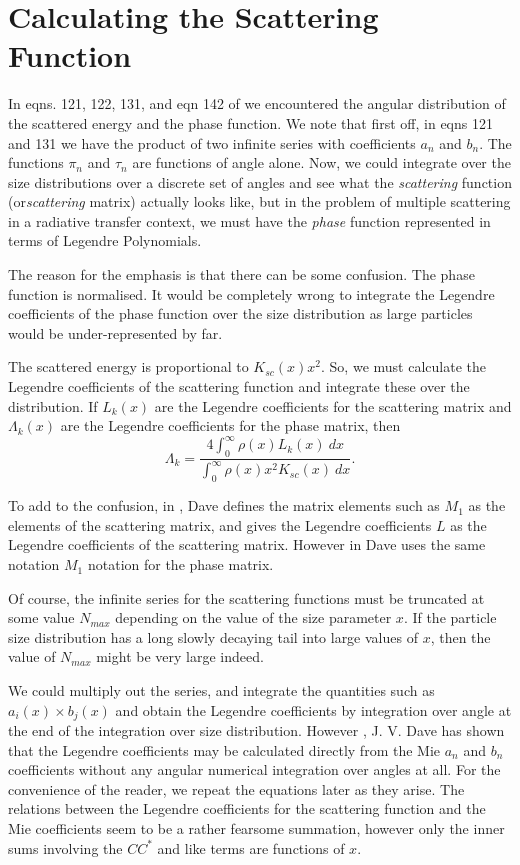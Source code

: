 \section{ Calculating the Scattering Function}

In eqns. 121, 122, 131, and eqn 142 of \cite{EMScatt:Mybib} we encountered the angular
 distribution of the scattered energy and the phase function.
We note that first off, in eqns 121 and 131 we have the product of two 
infinite series with  coefficients $a_n$ and $b_n$.
The functions $\pi_n$ and $\tau_n$ are functions of angle alone.
 Now, we could integrate over the size distributions
over a discrete set of angles and see what the {\it scattering} function
 (or{\it  scattering} matrix) actually looks like, but in
  the problem of 
multiple scattering in a radiative transfer context,
  we must have the {\it phase } function represented in
 terms of Legendre Polynomials. 

The reason for the emphasis is that there can be some confusion. The phase function
is normalised. It would be completely wrong to integrate the Legendre
coefficients of the phase function over the size distribution as large
 particles would be under-represented by far. 

The scattered energy is proportional to $K_{sc}(x) x^2$. So, we must
calculate the Legendre coefficients of the scattering function and integrate these
over the distribution. If $L_k(x)$ are the Legendre coefficients for the
 scattering matrix
and $\Lambda_k(x)$ are the Legendre coefficients for the phase matrix, then
\begin{equation}
\Lambda_k=\frac{ 
4\int_0^\infty \rho(x) L_k(x) \> dx }{
\int_0^\infty \rho(x) x^2 K_{sc}(x) \> dx }.
\end{equation}


To add to the confusion,
in \cite{Dave1:Mybib}, Dave defines the matrix elements such as $M_1$ as
the elements of the scattering matrix, and gives the Legendre coefficients $L$
as the Legendre coefficients of the scattering matrix. However in \cite{Dave2:Mybib}
Dave uses the same notation $M_1$ notation for the phase matrix.


Of course, the infinite series for the  scattering functions must 
be truncated at some value 
$N_{max}$ depending on the value 
of the size parameter $x$. If the particle size distribution 
has a long slowly decaying tail into large values of  $x$, then the 
value of $N_{max}$ might be very large indeed.


We could multiply out the series, and integrate the quantities such as
$a_i(x) \times b_j(x)$ and obtain the Legendre coefficients by integration over angle
at the end of the integration over size distribution.
However \cite{Dave1:Mybib}, J. V. Dave has 
shown that the Legendre coefficients
 may be calculated directly from the Mie $a_n$ and $b_n$ coefficients 
without any angular numerical integration over angles 
 at all. For the convenience of the reader, we repeat the
 equations later as they arise.
The relations between the Legendre coefficients for 
the scattering function and the Mie coefficients
 seem to be a rather fearsome summation, however only the inner
sums  involving the $C C^*$ and like terms are functions of $x$.

